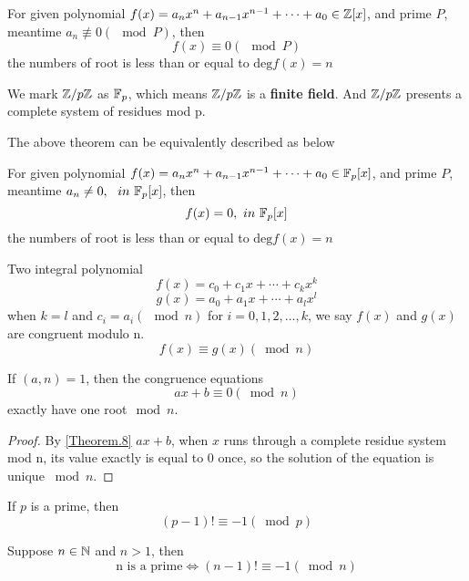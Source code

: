 \documentclass[11pt]{Numbertheory}
\begin{document}
\begin{theorem}
    For given polynomial $f(x) = a_nx^n + a_{n-1}x^{n-1} + \cdots + a_0\in \mathbb{Z} [x]$, and prime $P$, meantime $a_n \not \equiv 0(\mod P)$, then 
    \[  f(x) \equiv 0 (\mod P)\]
    the numbers of root is less than or equal to $\mathrm{deg}f(x)=n$
\end{theorem}

\begin{remark}
    We mark $\mathbb{Z}/{p\mathbb{Z}}$ as $\mathbb{F}_p$, which means $\mathbb{Z}/{p\mathbb{Z}}$ is a \textbf{finite field}. And 
    $\mathbb{Z}/{p\mathbb{Z}}$ presents a complete system of residues mod p.
\end{remark}
The above theorem can be equivalently described as below

\begin{theorem} 
    For given polynomial $f(x) = a_nx^n + a_{n-1}x^{n-1} + \cdots + a_0\in \mathbb{F}_p [x]$, and prime $P$, meantime $a_n \ne 0,\ \ in\ \mathbb{F}_p [x]$, then 
    \[  f(x) = 0 , \ in\  \mathbb{F}_p [x]\]
    the numbers of root is less than or equal to $\mathrm{deg}f(x)=n$
\end{theorem}

\begin{definition} [Equal]
    Two integral polynomial
    \[ f(x) = c_0 + c_1x + \cdots + c_kx^k\]
    \[ g(x) = a_0 + a_1x + \cdots + a_lx^l\]
    when $k=l$ and $c_i = a_i(\mod n)$ for $i = 0, 1, 2, \ldots, k$, we say $f(x)$ and $g(x)$ are congruent modulo n.
    \[ f(x) \equiv g(x)  (\bmod n) \]
\end{definition}

\begin{theorem}
    If $(a, n)=1$, then the congruence equations
    \[ ax + b \equiv 0 (\bmod n)\]
    exactly have one root$\mod n$.
\end{theorem}

\begin{proof} 
    By \ref{Theorem.8} $ax + b$, when $x$ runs through a complete residue system mod n, its value exactly is equal to 0 once, so the solution of the equation is unique $\bmod n$.
\end{proof}

\begin{theorem} 
    If $p$ is a prime, then 
    \[  (p-1)! \equiv -1 (\bmod p) \]
\end{theorem}

\begin{theorem}
    Suppose $n\in \mathbb{N}$ and $n > 1$, then
    \[  \mbox{n is a prime} \Longleftrightarrow (n-1)! \equiv -1(\bmod n)  \]
\end{theorem}
\end{document}
